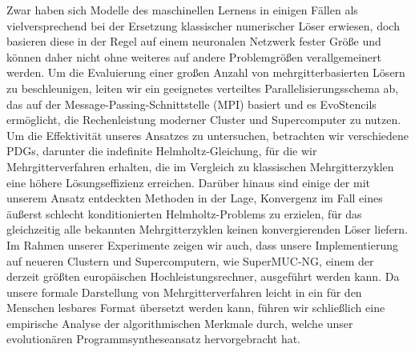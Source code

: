 Zwar haben sich Modelle des maschinellen Lernens in einigen Fällen als vielversprechend bei der Ersetzung klassischer numerischer Löser erwiesen, doch basieren diese in der Regel auf einem neuronalen Netzwerk fester Größe und können daher nicht ohne weiteres auf andere Problemgrößen verallgemeinert werden.
Um die Evaluierung einer großen Anzahl von mehrgitterbasierten Lösern zu beschleunigen, leiten wir ein geeignetes verteiltes Parallelisierungsschema ab, das auf der Message-Passing-Schnittstelle (MPI) basiert und es EvoStencils ermöglicht, die Rechenleistung moderner Cluster und Supercomputer zu nutzen.
Um die Effektivität unseres Ansatzes zu untersuchen, betrachten wir verschiedene PDGs, darunter die indefinite Helmholtz-Gleichung, für die wir Mehrgitterverfahren erhalten, die im Vergleich zu klassischen Mehrgitterzyklen eine höhere Lösungseffizienz erreichen.
Darüber hinaus sind einige der mit unserem Ansatz entdeckten Methoden in der Lage, Konvergenz im Fall eines äußerst schlecht konditionierten Helmholtz-Problems zu erzielen, für das gleichzeitig alle bekannten Mehrgitterzyklen keinen konvergierenden Löser liefern.
Im Rahmen unserer Experimente zeigen wir auch, dass unsere Implementierung auf neueren Clustern und Supercomputern, wie SuperMUC-NG, einem der derzeit größten europäischen Hochleistungsrechner, ausgeführt werden kann.
Da unsere formale Darstellung von Mehrgitterverfahren leicht in ein für den Menschen lesbares Format übersetzt werden kann, führen wir schließlich eine empirische Analyse der algorithmischen Merkmale durch, welche unser evolutionären Programmsyntheseansatz hervorgebracht hat.